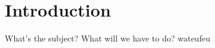 \part{Introduction}

What's the subject? What will we have to do? \cite{subject}
wateufeu \cite{ALMDHSC}